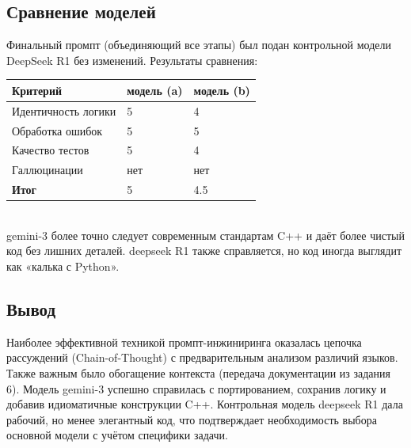 \subsection{Сравнение моделей}
Финальный промпт (объединяющий все этапы) был подан контрольной модели DeepSeek R1 без изменений.
Результаты сравнения:
\begin{table}[h!]
	\centering
	\begin{tabular}{|l|p{5cm}|p{5cm}|}
		\hline
		\textbf{Критерий} & \textbf{модель (a)} & \textbf{модель (b)} \\
		\hline
		Идентичность логики & 5 & 4 \\
		\hline
		Обработка ошибок & 5 & 5 \\
		\hline
		Качество тестов  & 5 & 4\\
		\hline
		Галлюцинации & нет & нет \\
		\hline
		\textbf{Итог} & 5 & 4.5\\
		\hline
	\end{tabular}
\end{table} \\
gemini-3 более точно следует современным стандартам C++ и даёт более чистый код без лишних деталей. deepseek R1 также справляется, но код иногда выглядит как «калька с Python».
\subsection{Вывод}
Наиболее эффективной техникой промпт-инжиниринга оказалась цепочка рассуждений (Chain-of-Thought) с предварительным анализом различий языков. Также важным было обогащение контекста (передача документации из задания 6). Модель gemini-3 успешно справилась с портированием, сохранив логику и добавив идиоматичные конструкции C++. Контрольная модель deepseek R1 дала рабочий, но менее элегантный код, что подтверждает необходимость выбора основной модели с учётом специфики задачи.